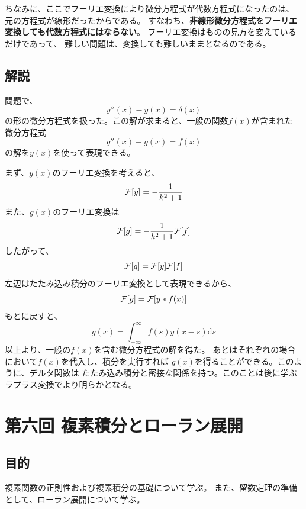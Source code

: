 \documentclass{jarticle}
\newcommand{\diff}{\mathrm d}
\begin{document}
ちなみに、ここでフーリエ変換により微分方程式が代数方程式になったのは、
元の方程式が線形だったからである。
すなわち、{\bf 非線形微分方程式をフーリエ変換しても代数方程式にはならない}。
フーリエ変換はものの見方を変えているだけであって、
難しい問題は、変換しても難しいままとなるのである。

\subsection{解説}

問題で、
$$
  y''(x) - y(x) = \delta(x)
$$
の形の微分方程式を扱った。この解が求まると、一般の関数$f(x)$が含まれた
微分方程式
$$
  g''(x) - g(x) = f(x)
$$
の解を$y(x)$を使って表現できる。

まず、$y(x)$のフーリエ変換を考えると、
\begin{equation}
  {\cal F}[y] = -\frac{1}{k^2+1}
\end{equation}
また、$g(x)$のフーリエ変換は
\begin{equation}
  {\cal F}[g] = -\frac{1}{k^2+1} {\cal F}[f]
\end{equation}
したがって、
\begin{equation}
  {\cal F}[g] = {\cal F}[y] {\cal F}[f]
\end{equation}
左辺はたたみ込み積分のフーリエ変換として表現できるから、
\begin{equation}
  {\cal F}[g] = {\cal F}[y*f(x)]
\end{equation}
もとに戻すと、
\begin{equation}
  g(x) = \int_{-\infty}^{\infty}f(s) y(x-s)  \diff s
\end{equation}
以上より、一般の$f(x)$を含む微分方程式の解を得た。
あとはそれぞれの場合において$f(x)$を代入し、積分を実行すれば
$g(x)$を得ることができる。このように、デルタ関数は
たたみ込み積分と密接な関係を持つ。このことは後に学ぶ
ラプラス変換でより明らかとなる。


\newpage
\section{第六回 複素積分とローラン展開}

\subsection{目的}

複素関数の正則性および複素積分の基礎について学ぶ。
また、留数定理の準備として、ローラン展開について学ぶ。
\end{document}
